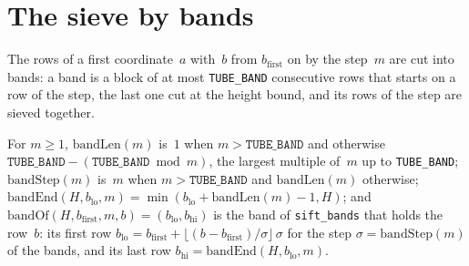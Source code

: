 \section{The sieve by bands}\label{sec:bands}

The rows of a first coordinate~$a$ with~$b$ from $b_{\mathrm{first}}$ on by the step~$m$ are cut
into bands: a band is a block of at most \texttt{TUBE\_BAND} consecutive rows that starts on a row
of the step, the last one cut at the height bound, and its rows of the step are sieved together.

\begin{definition}\label{def:bandOf}
  \leanok
  For $m \ge 1$, $\mathrm{bandLen}(m)$ is~$1$ when $m > \mathtt{TUBE\_BAND}$ and otherwise
  $\mathtt{TUBE\_BAND} - (\mathtt{TUBE\_BAND} \bmod m)$, the largest multiple of~$m$ up to
  \texttt{TUBE\_BAND}; $\mathrm{bandStep}(m)$ is~$m$ when $m > \mathtt{TUBE\_BAND}$ and
  $\mathrm{bandLen}(m)$ otherwise; $\mathrm{bandEnd}(H, b_{\mathrm{lo}}, m) = \min(b_{\mathrm{lo}} +
  \mathrm{bandLen}(m) - 1, H)$; and $\mathrm{bandOf}(H, b_{\mathrm{first}}, m, b) = (b_{\mathrm{lo}},
  b_{\mathrm{hi}})$ is the band of \texttt{sift\_bands} that holds the row~$b$: its first row
  $b_{\mathrm{lo}} = b_{\mathrm{first}} + \lfloor (b - b_{\mathrm{first}})/\sigma \rfloor\, \sigma$
  for the step $\sigma = \mathrm{bandStep}(m)$ of the bands, and its last row $b_{\mathrm{hi}} =
  \mathrm{bandEnd}(H, b_{\mathrm{lo}}, m)$.
\end{definition}

